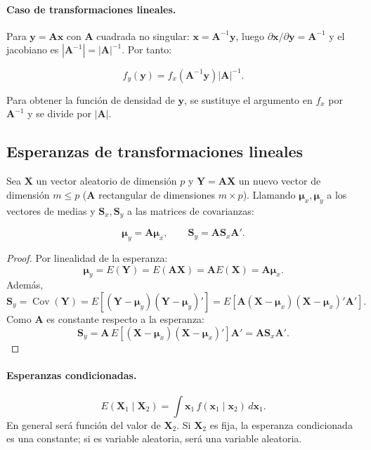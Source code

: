 \documentclass[12pt, a4paper]{article}
\theoremstyle{plain}
\theoremstyle{definition}
\theoremstyle{remark}
\newcommand{\mat}[1]{\mathbf{#1}}
\newcommand{\Cov}{\operatorname{Cov}}
\begin{document}
\paragraph{Caso de transformaciones lineales.}
Para $\mathbf{y}=\mat{A}\mathbf{x}$ con $\mat{A}$ cuadrada no singular:
$\mathbf{x}=\mat{A}^{-1}\mathbf{y}$, luego $\partial\mathbf{x}/\partial\mathbf{y}=\mat{A}^{-1}$
y el jacobiano es $|\mat{A}^{-1}|=|\mat{A}|^{-1}$. Por tanto:
\begin{mdframed}[style=resultado]
\[
  f_y(\mathbf{y}) = f_x\!\left(\mat{A}^{-1}\mathbf{y}\right)|\mat{A}|^{-1}.
\]
\end{mdframed}
Para obtener la función de densidad de $\mathbf{y}$, se sustituye el argumento
en $f_x$ por $\mat{A}^{-1}$ y se divide por $|\mat{A}|$.

\subsection{Esperanzas de transformaciones lineales}

Sea $\mathbf{X}$ un vector aleatorio de dimensión $p$ y $\mathbf{Y}=\mat{A}\mathbf{X}$
un nuevo vector de dimensión $m\le p$ ($\mat{A}$ rectangular de dimensiones
$m\times p$). Llamando $\boldsymbol{\mu}_x, \boldsymbol{\mu}_y$ a los vectores
de medias y $\mat{S}_x, \mat{S}_y$ a las matrices de covarianzas:

\begin{mdframed}[style=resultado]
\[
  \boldsymbol{\mu}_y = \mat{A}\boldsymbol{\mu}_x, \qquad
  \mat{S}_y = \mat{A}\mat{S}_x\mat{A}'.
\]
\end{mdframed}

\begin{proof}
Por linealidad de la esperanza:
\[
  \boldsymbol{\mu}_y=E(\mathbf{Y})=E(\mat{A}\mathbf{X})=\mat{A}E(\mathbf{X})
  =\mat{A}\boldsymbol{\mu}_x.
\]
Además,
\[
  \mat{S}_y
  = \Cov(\mathbf{Y})
  = E\!\left[(\mathbf{Y}-\boldsymbol{\mu}_y)(\mathbf{Y}-\boldsymbol{\mu}_y)'\right]
  = E\!\left[\mat{A}(\mathbf{X}-\boldsymbol{\mu}_x)(\mathbf{X}-\boldsymbol{\mu}_x)'\mat{A}'\right].
\]
Como $\mat{A}$ es constante respecto a la esperanza:
\[
  \mat{S}_y
  = \mat{A}\,E\!\left[(\mathbf{X}-\boldsymbol{\mu}_x)(\mathbf{X}-\boldsymbol{\mu}_x)'\right]\mat{A}'
  = \mat{A}\mat{S}_x\mat{A}'.
\]
\end{proof}

\paragraph{Esperanzas condicionadas.}
\[
  E(\mathbf{X}_1\mid\mathbf{X}_2) = \int \mathbf{x}_1\,f(\mathbf{x}_1\mid\mathbf{x}_2)\,d\mathbf{x}_1.
\]
En general será función del valor de $\mathbf{X}_2$. Si $\mathbf{X}_2$ es
fija, la esperanza condicionada es una constante; si es variable aleatoria,
será una variable aleatoria.
\end{document}
